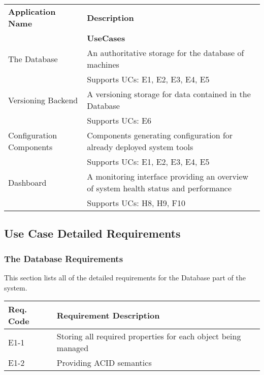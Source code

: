 \documentclass[12pt]{article}
\begin{document}
\begin{center}
	\begin{tabular}{| p{5cm} | p{10cm} |}
		\hline
		\textbf{Application Name} & \textbf{Description}\\ \cline{2-1}
															& \textbf{UseCases}\\
		\hline
        The Database & An authoritative storage for the database of machines\\ \cline{2-1}
                        & Supports UCs: E1, E2, E3, E4, E5 \\
        \hline
        Versioning Backend & A versioning storage for data contained in the Database \\ \cline{2-1}
                        & Supports UCs: E6 \\
        \hline
        Configuration Components & Components generating configuration for already deployed system tools \\ \cline{2-1}
                        & Supports UCs: E1, E2, E3, E4, E5 \\
        \hline
        Dashboard & A monitoring interface providing an overview of system health status and performance \\ \cline{2-1}
                        & Supports UCs: H8, H9, F10 \\
		\hline
	\end{tabular}
	\label{tab:Applications}
\end{center}

\subsection{Use Case Detailed Requirements}

\subsubsection{The Database Requirements}
This section lists all of the detailed requirements for the Database part of the system.

\begin{center}
	\begin{tabular}{| p{2.5cm} | p{12.5cm} |}
	 	\hline
		\textbf{Req. Code} & \textbf{Requirement Description}\\
		\hline
        E1-1    & Storing all required properties for each object being managed\\
        \hline
        E1-2    & Providing ACID semantics\\
		\hline
	\end{tabular}
	\label{tab:DatabaseRequirements}
\end{center}
\end{document}
